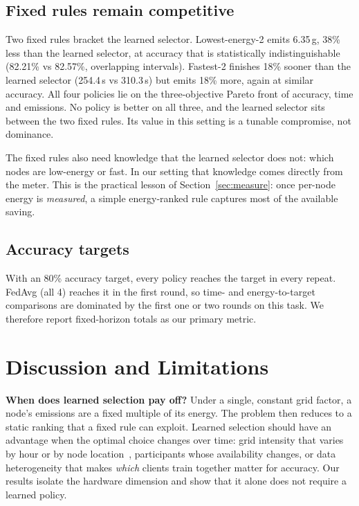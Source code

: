 \documentclass[conference]{IEEEtran}
\begin{document}
\subsection{Fixed rules remain competitive}

Two fixed rules bracket the learned selector. Lowest-energy-2 emits 6.35\,g, 38\% less than the learned selector, at accuracy that is statistically indistinguishable (82.21\% vs 82.57\%, overlapping intervals). Fastest-2 finishes 18\% sooner than the learned selector (254.4\,s vs 310.3\,s) but emits 18\% more, again at similar accuracy. All four policies lie on the three-objective Pareto front of accuracy, time and emissions. No policy is better on all three, and the learned selector sits between the two fixed rules. Its value in this setting is a tunable compromise, not dominance.

The fixed rules also need knowledge that the learned selector does not: which nodes are low-energy or fast. In our setting that knowledge comes directly from the meter. This is the practical lesson of Section~\ref{sec:measure}: once per-node energy is \emph{measured}, a simple energy-ranked rule captures most of the available saving.

\subsection{Accuracy targets}

With an 80\% accuracy target, every policy reaches the target in every repeat. FedAvg (all 4) reaches it in the first round, so time- and energy-to-target comparisons are dominated by the first one or two rounds on this task. We therefore report fixed-horizon totals as our primary metric.

\section{Discussion and Limitations}\label{sec:discussion}

\textbf{When does learned selection pay off?} Under a single, constant grid factor, a node's emissions are a fixed multiple of its energy. The problem then reduces to a static ranking that a fixed rule can exploit. Learned selection should have an advantage when the optimal choice changes over time: grid intensity that varies by hour or by node location~\cite{radovanovic2023carbon,wiesner2024fedzero}, participants whose availability changes, or data heterogeneity that makes \emph{which} clients train together matter for accuracy. Our results isolate the hardware dimension and show that it alone does not require a learned policy.
\end{document}
